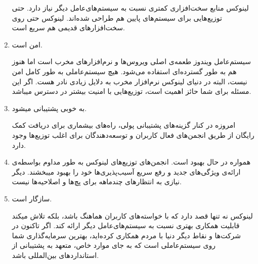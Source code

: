 \begin{enumerate}
لینوکس منابع سخت‌افزاری کمتری نسبت به سیستم‌های‌عامل دیگر نیاز دارد. حتی توزیع‌هایی برای سیستم‌های پایین هم طراحی شده‌اند. لینوکس حتی روی سخت‌افزارهای قدیمی هم سریع است.
\item  امن است.

سیستم‌عامل ویندوز طعمه‌ی اصلی ویروس‌ها و نرم‌افزارهای مخرب است اما هنوز هم به طور گسترده‌ای استفاده می‌شود. هیچ سیستم‌عاملی به طور کامل امن نیست، البته در دنیای لینوکس نرم‌افزار مخرب به دلایل زیادی نادر هست. اگر این مسئله برای شما حائز اهمیت است، توزیع‌هایی با امنیت بیشتر در دسترس میباشد.
\item  به خوبی پشتیبانی میشود.

امروزه در کنار گزینه‌های پشتیبانی پولی، راه‌های بیشماری برای دریافت کمک رایگان از طریق انجمن‌های فعال کاربران و توسعه‌دهندگان برای اغلب توزیع‌ها وجود دارد.
\item  همواره در حال بهبود است.
انجمن‌های توزیع‌های لینوکس به طور مداوم بواسطه‌ی ارائه‌ی ویژگی‌های جدید و رفع سریع آسیب‌پذیری‌ها خود را بهبود میبخشند. دیگر نیازی به انتظارهای چندماهه برای پچ‌ها و اصلاحیه‌ها نیست.
\item  سازگار است.

لینوکس نه تنها قصد دارد که با خواسته‌های کاربران هماهنگ باشد، بلکه تلاش میکند قابلیت همکاری بهتری نسبت به سیستم‌های‌عامل دیگر ارائه کند. اگر تاکنون در شرکت‌ها و نقاط دیگر دنیا با مردم همکاری کرده‌اید، بهترین سرمایه‌گذاری شما روی سیستم‌عاملی است که به جای موارد خاص، متعهد به پشتیبانی از استانداردهای بین‌المللی باشد.
\end{enumerate}